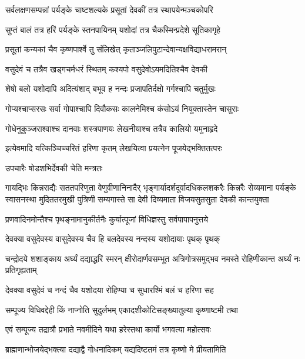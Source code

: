 \twolineshloka
{सर्वलक्षणसम्पन्नां पर्यङ्के चाष्टशल्यके}
{प्रसूतां देवकीं तत्र स्थापयेन्मञ्चकोपरि} %

\twolineshloka
{सुप्तं बालं तत्र हरिं पर्यङ्के स्तनपायिनम्}
{यशोदां तत्र चैकस्मिन्प्रदेशे सूतिकागृहे} %

\twolineshloka
{प्रसूतां कन्यकां चैव कृष्णपार्श्वे तु संलिखेत्}
{कृताञ्जलिपुटान्देवान्यक्षविद्याधरामरान्} %

\twolineshloka
{वसुदेवं च तत्रैव खड्गचर्मधरं स्थितम्}
{कश्यपो वसुदेवोऽयमदितिश्चैव देवकी} %

\twolineshloka
{शेषो बलो यशोदापि अदित्यंशाद् बभूव ह}
{नन्दः प्रजापतिर्दक्षो गर्गश्चापि चतुर्मुखः} %

\twolineshloka
{गोप्यश्चाप्सरसः सर्वा गोपाश्चापि दिवौकसः}
{कालनेमिश्च कंसोऽयं नियुक्तास्तेन चासुराः} %

\twolineshloka
{गोधेनुकुञ्जराश्वाश्च दानवाः शस्त्रपाणयः}
{लेखनीयाश्च तत्रैव कालियो यमुनाहृदे} %

\twolineshloka
{इत्येवमादि यत्किञ्चिच्चरितं हरिणा कृतम्}
{लेखयित्वा प्रयत्नेन पूजयेद्भक्तितत्परः} %

\onelineshloka
{उपचारैः षोडशभिर्देवकी चेति मन्त्रतः} %

\fourlineindentedshloka
{गायद्भिः किन्नराद्यैः सततपरिणुता वेणुवीणानिनादैर्}
{भृङ्गार्यादर्शदूर्वादधिकलशकरैः किन्नरैः सेव्यमाना}
{पर्यङ्के स्वासनस्था मुदिततरमुखी पुत्रिणी सम्यगास्ते}
{सा देवी दिव्यमाता विजयसुतसुता देवकी कान्तयुक्ता} %

\twolineshloka
{प्रणवादिनमोन्तैश्च पृथङ्नामानुकीर्तनैः}
{कुर्यात्पूजां विधिज्ञस्तु सर्वपापापनुत्तये} %

\twolineshloka
{देवक्या वसुदेवस्य वासुदेवस्य चैव हि}
{बलदेवस्य नन्दस्य यशोदायाः पृथक् पृथक्} %


\threelineshloka
{चन्द्रोदये शशाङ्काय अर्घ्यं दद्याद्धरिं स्मरन्}
{क्षीरोदार्णवसम्भूत अत्रिगोत्रसमुद्भव}
{नमस्ते रोहिणीकान्त अर्घ्यं नः प्रतिगृह्यताम्} %

\twolineshloka
{देवक्या वसुदेवं च नन्दं चैव यशोदया}
{रोहिण्या च सुधारश्मिं बलं च हरिणा सह} %

\twolineshloka
{सम्पूज्य विधिवद्देही किं नाप्नोति सुदुर्लभम्}
{एकादशीकोटिसङ्ख्यातुल्या कृष्णाष्टमी तथा} %

\twolineshloka
{एवं सम्पूज्य तद्रात्रौ प्रभाते नवमीदिने}
{यथा हरेस्तथा कार्यो भगवत्या महोत्सवः} %

\twolineshloka
{ब्राह्मणान्भोजयेद्भक्त्या दद्याद्वै गोधनादिकम्}
{यद्यदिष्टतमं तत्र कृष्णो मे प्रीयतामिति} %

